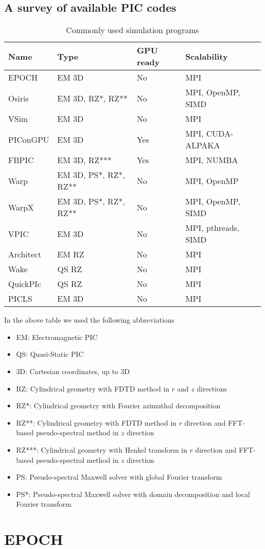 \documentclass[12pt, class=report, crop=false]{standalone}
\begin{document}
\subsection{A survey of available PIC codes}


\begin{table}
  \begin{tabular}{l l l l}
  \toprule
  \textbf{Name} & \textbf{Type} & \textbf{GPU ready} & \textbf{Scalability}\\
  \midrule
  EPOCH & EM 3D & No & MPI\\
  Osiris & EM 3D, RZ*, RZ** & No & MPI, OpenMP, SIMD\\
  VSim & EM 3D & No & MPI\\
  PIConGPU & EM 3D & Yes & MPI, CUDA-ALPAKA\\
  FBPIC & EM 3D, RZ*** & Yes & MPI, NUMBA\\
  Warp & EM 3D, PS*, RZ*, RZ** & No & MPI, OpenMP\\
  WarpX & EM 3D, PS*, RZ*, RZ** & No & MPI, OpenMP, SIMD\\
  VPIC & EM 3D & No & MPI, pthreads, SIMD\\
  Architect & EM RZ & No & MPI\\
  Wake & QS RZ & No & MPI\\
  QuickPIc & QS RZ & No & MPI\\
  PICLS & EM 3D & No & MPI\\
  \bottomrule
  \end{tabular}
  \caption{Commonly used simulation programs}%
  \label{tab:pic-software}
\end{table}

In the above table we used the following abbreviations
\begin{itemize}
    \item EM: Electromagnetic PIC
    \item QS: Quasi-Static PIC
    \item 3D: Cartesian coordinates, up to 3D
    \item RZ: Cylindrical geometry with FDTD method in \(r\) and \(z\) directions
    \item RZ*: Cylindrical geometry with Fourier azimuthal decomposition
    \item RZ**: Cylindrical geometry with FDTD method in \(r\) direction
                and FFT-based pseudo-spectral method in \(z\) direction
    \item RZ***: Cylindrical geometry with Henkel transform in \(r\) direction
                and FFT-based pseudo-spectral method in \(z\) direction
    \item PS: Pseudo-spectral Maxwell solver with global Fourier transform
    \item PS*: Pseudo-spectral Maxwell solver with domain decomposition and local Fourier transform
\end{itemize}


\section{EPOCH}
\end{document}
